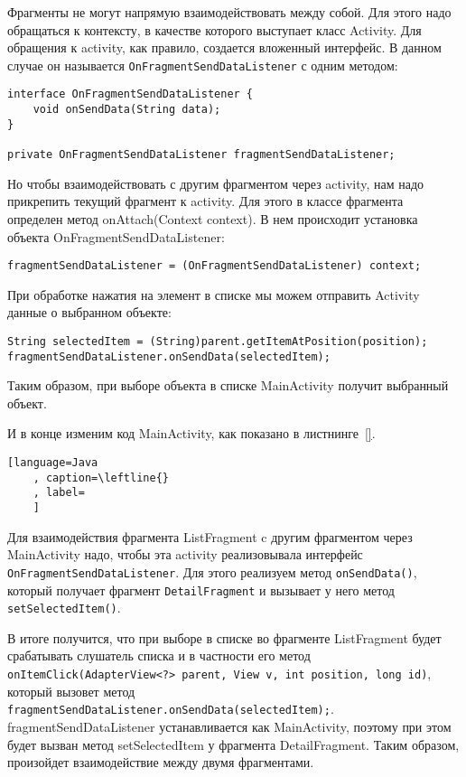 Фрагменты не могут напрямую взаимодействовать между собой. Для этого
надо обращаться к контексту, в качестве которого выступает класс Activity.
Для обращения к activity, как правило, создается вложенный интерфейс. В
данном случае он называется \texttt{OnFragmentSendDataListener} с одним
методом:

\begin{verbatim}
interface OnFragmentSendDataListener {
	void onSendData(String data);
}

private OnFragmentSendDataListener fragmentSendDataListener;
\end{verbatim}

Но чтобы взаимодействовать с другим фрагментом через activity, нам надо
прикрепить текущий фрагмент к activity. Для этого в классе фрагмента
определен метод onAttach(Context context). В нем происходит установка
объекта OnFragmentSendDataListener:

\begin{verbatim}
fragmentSendDataListener = (OnFragmentSendDataListener) context;
\end{verbatim}

При обработке нажатия на элемент в списке мы можем отправить Activity
данные о выбранном объекте:

\begin{verbatim}
String selectedItem = (String)parent.getItemAtPosition(position);
fragmentSendDataListener.onSendData(selectedItem);
\end{verbatim}

Таким образом, при выборе объекта в списке MainActivity получит
выбранный объект.

И в конце изменим код MainActivity, как показано в листнинге~\ref{}.

\begin{lstlisting}[language=Java
	, caption=\leftline{}
	, label=
	]
\end{lstlisting}

Для взаимодействия фрагмента ListFragment c другим фрагментом через
MainActivity надо, чтобы эта activity реализовывала интерфейс
\texttt{OnFragmentSendDataListener}. Для этого реализуем метод
\texttt{onSendData()},
который получает фрагмент \texttt{DetailFragment} и вызывает у него метод
\texttt{setSelectedItem()}.\par
В итоге получится, что при выборе в списке во фрагменте ListFragment будет
срабатывать слушатель списка и в частности его метод
\texttt{onItemClick(AdapterView<?> parent, View v, int position, long id)},
который вызовет метод
\texttt{fragmentSendDataListener.onSendData(selectedItem);}.
fragmentSendDataListener устанавливается как MainActivity, поэтому при
этом будет вызван метод setSelectedItem у фрагмента DetailFragment. Таким
образом, произойдет взаимодействие между двумя фрагментами.

